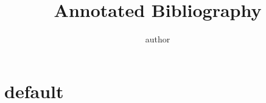 \documentclass{article}
\title{Annotated Bibliography}
\author{author}
\date{}
\begin{document}
\maketitle
\tableofcontents

\newpage

\section{default}

\clearpage
\printbibliography
\end{document}
